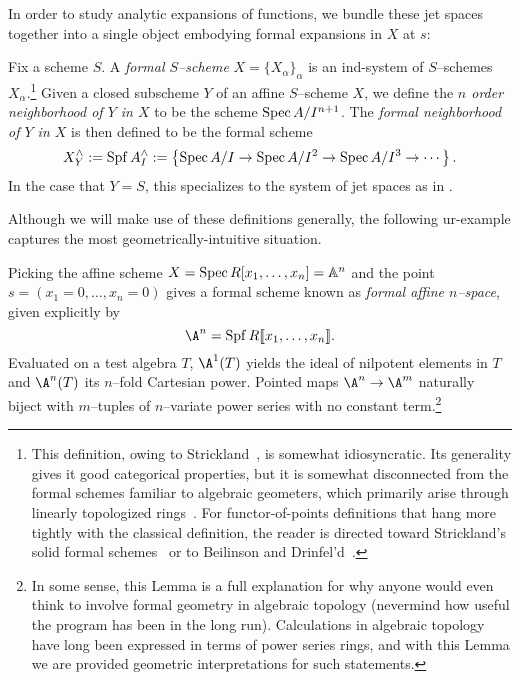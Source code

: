 In order to study analytic expansions of functions, we bundle these jet spaces together into a single object embodying formal expansions in \(X\) at \(s\):
\begin{definition}\label{DefnCompletion}
Fix a scheme \(S\).  A \textit{formal \(S\)--scheme} \(X = \{X_\alpha\}_\alpha\) is an ind-system of \(S\)--schemes \(X_\alpha\).\footnote{This definition, owing to Strickland~\cite[Definition 4.1]{StricklandFSFG}, is somewhat idiosyncratic.  Its generality gives it good categorical properties, but it is somewhat disconnected from the formal schemes familiar to algebraic geometers, which primarily arise through linearly topologized rings~\cite[pg.\ 194]{Hartshorne}.  For functor-of-points definitions that hang more tightly with the classical definition, the reader is directed toward Strickland's solid formal schemes~\cite[Section 4.2]{StricklandFSFG} or to Beilinson and Drinfel'd~\cite[Section 7.11.1]{BeilinsonDrinfeld}.}  Given a closed subscheme \(Y\) of an affine \(S\)--scheme \(X\), we define the \textit{\(n\){\th} order neighborhood of \(Y\) in \(X\)} to be the scheme \(\operatorname{Spec} A/I^{n+1}\).  The \textit{formal neighborhood of \(Y\) in \(X\)} is then defined to be the formal scheme \[X^\wedge_Y := \operatorname{Spf} A^\wedge_I := \left\{ \operatorname{Spec} A/I \to \operatorname{Spec} A/I^2 \to \operatorname{Spec} A/I^3 \to \cdots \right\}.\]  In the case that \(Y = S\), this specializes to the system of jet spaces as in .
\end{definition}

Although we will make use of these definitions generally, the following ur-example captures the most geometrically-intuitive situation.

\begin{example}\label{MapsOfFVarsArePowerSeries}
Picking the affine scheme \(X = \operatorname{Spec} R[x_1, \ldots, x_n] = \mathbb A^n\) and the point \(s = (x_1 = 0, \ldots, x_n = 0)\) gives a formal scheme known as \textit{formal affine \(n\)--space}, given explicitly by \[\A^n = \Spf R\llbracket x_1, \ldots, x_n\rrbracket.\]  Evaluated on a test algebra \(T\), \(\A^1(T)\) yields the ideal of nilpotent elements in \(T\) and \(\A^n(T)\) its \(n\)--fold Cartesian power.  Pointed maps \(\A^n \to \A^m\) naturally biject with \(m\)--tuples of \(n\)--variate power series with no constant term.\footnote{In some sense, this Lemma is a full explanation for why anyone would even think to involve formal geometry in algebraic topology (nevermind how useful the program has been in the long run).  Calculations in algebraic topology have long been expressed in terms of power series rings, and with this Lemma we are provided geometric interpretations for such statements.}
\end{example}

